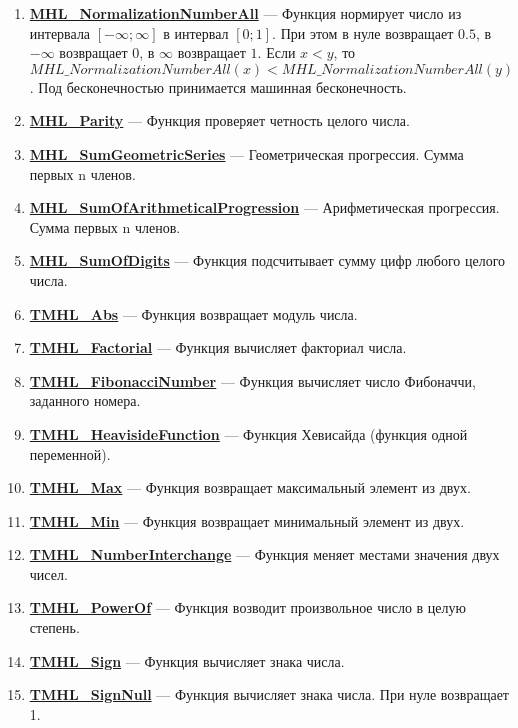\documentclass[a4paper,12pt]{article}
\begin{document}
\begin{enumerate}
\item \textbf{\hyperref[MHL_NormalizationNumberAll]{MHL\_NormalizationNumberAll}} --- Функция нормирует число из интервала $\left[-\infty;\infty \right] $ в интервал $\left[0;1\right]$. При этом в нуле возвращает $0.5$, в $-\infty$ возвращает $0$, в $\infty$ возвращает $1$. Если $x<y$, то $MHL\_NormalizationNumberAll(x)<MHL\_NormalizationNumberAll(y)$. Под бесконечностью принимается машинная бесконечность.

\item \textbf{\hyperref[MHL_Parity]{MHL\_Parity}} --- Функция проверяет четность целого числа.

\item \textbf{\hyperref[MHL_SumGeometricSeries]{MHL\_SumGeometricSeries}} --- Геометрическая прогрессия. Сумма первых n членов.

\item \textbf{\hyperref[MHL_SumOfArithmeticalProgression]{MHL\_SumOfArithmeticalProgression}} --- Арифметическая прогрессия. Сумма первых n членов.

\item \textbf{\hyperref[MHL_SumOfDigits]{MHL\_SumOfDigits}} --- Функция подсчитывает сумму цифр любого целого числа.

\item \textbf{\hyperref[TMHL_Abs]{TMHL\_Abs}} --- Функция возвращает модуль числа.

\item \textbf{\hyperref[TMHL_Factorial]{TMHL\_Factorial}} --- Функция вычисляет факториал числа.

\item \textbf{\hyperref[TMHL_FibonacciNumber]{TMHL\_FibonacciNumber}} --- Функция вычисляет число Фибоначчи, заданного номера.

\item \textbf{\hyperref[TMHL_HeavisideFunction]{TMHL\_HeavisideFunction}} --- Функция Хевисайда (функция одной переменной).

\item \textbf{\hyperref[TMHL_Max]{TMHL\_Max}} --- Функция возвращает максимальный элемент из двух.

\item \textbf{\hyperref[TMHL_Min]{TMHL\_Min}} --- Функция возвращает минимальный элемент из двух.

\item \textbf{\hyperref[TMHL_NumberInterchange]{TMHL\_NumberInterchange}} --- Функция меняет местами значения двух чисел.

\item \textbf{\hyperref[TMHL_PowerOf]{TMHL\_PowerOf}} --- Функция возводит произвольное число в целую степень.

\item \textbf{\hyperref[TMHL_Sign]{TMHL\_Sign}} --- Функция вычисляет знака числа.

\item \textbf{\hyperref[TMHL_SignNull]{TMHL\_SignNull}} --- Функция вычисляет знака числа. При нуле возвращает 1.

\end{enumerate}
\end{document}
